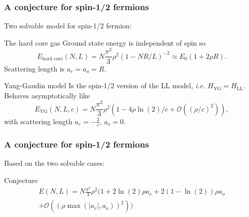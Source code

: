 \documentclass{beamer}[10]
\newcommand{\abs}[1]{\left\lvert #1 \right\rvert}
\newcommand{\ie}{\emph{i.e.} }
\begin{document}
\begin{frame}
	\frametitle{A conjecture for spin-1/2 fermions}
	\vspace*{-0.2cm}
	Two solvable model for spin-1/2 fermion:
	\vspace*{-0.1cm}
	\begin{block}{\normalsize The hard core gas}
		\small Ground state energy is independent of spin
		so \begin{equation}
		E_{\text{hard core}}(N,L)=N\frac{\pi^2}{3}\rho^2 (1-NR/L)^{-2}\approx E_0(1+2\rho R).
		\end{equation}
		Scattering length is $ a_e=a_o=R $.
	\end{block}
\vspace*{-0.2cm}
	\begin{block}{\normalsize Yang-Gaudin model}
		\small Is the spin-1/2 version of the LL model, \ie $ H_{\text{YG}}=H_{\text{LL}} $.
		 Behaves asymptotically like
		 \begin{equation}
		 E_{\text{YG}}(N,L,c)=N\frac{\pi^2}{3}\rho^2\left(1-4\rho\ln(2)/c+\mathcal{O}\left((\rho/c)^2\right)\right),
		 \end{equation}
		 with scattering length $ a_e=-\frac{2}{c} $, $ a_o=0 $.
		\end{block}
\end{frame}
\begin{frame}
	\frametitle{A conjecture for spin-1/2 fermions}
	Based on the two solvable cases: \begin{block}{Conjecture}
		\small\begin{equation}
		\begin{aligned}
		E(N,L)=N\frac{\pi^2}{3}\rho^2\Big(1+2\ln(2)\rho a_e+2(1-\ln(2))\rho a_o\\+\mathcal{O}\left((\rho\max(\abs{a_e},a_o))^2\right)\Big)
		\end{aligned}
		\end{equation}
	\end{block}
\end{frame}

\begin{frame}
\end{frame}
\end{document}
